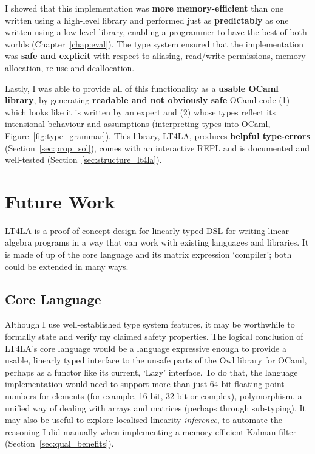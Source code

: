 I showed that this implementation was \textbf{more memory-efficient} than one
written using a high-level library and performed just as
\textbf{predictably} as one written using a low-level library,
enabling a programmer to have the best of both worlds
(Chapter~\ref{chap:eval}). The type system ensured that the implementation was
\textbf{safe and explicit} with respect to aliasing, read/write permissions,
memory allocation, re-use and deallocation.

Lastly, I was able to provide all of this functionality as a \textbf{usable
OCaml library}, by generating \textbf{readable and not obviously safe} OCaml
code (1) which looks like it is written by an expert and (2) whose types
reflect its intensional behaviour and assumptions (interpreting types into
OCaml, Figure~\ref{fig:type_grammar}). This library, LT4LA, produces
\textbf{helpful type-errors} (Section~\ref{sec:prop_sol}), comes with an
interactive REPL and is documented and well-tested
(Section~\ref{sec:structure_lt4la}).

\section{Future Work}

LT4LA is a proof-of-concept design for linearly typed DSL for writing
linear-algebra programs in a way that can work with existing languages and
libraries. It is made of up of the core language and its matrix expression
`compiler'; both could be extended in many ways.

\subsection{Core Language}

Although I use well-established type system features, it may be worthwhile to
formally state and verify my claimed safety properties.  The logical conclusion
of LT4LA's core language would be a language expressive enough to provide a
usable, linearly typed interface to the unsafe parts of the Owl library for
OCaml, perhaps as a functor like its current, `Lazy' interface.  To do that,
the language implementation would need to support more than just 64-bit
floating-point numbers for elements (for example, 16-bit, 32-bit or complex),
polymorphism, a unified way of dealing with arrays and matrices (perhaps
through sub-typing). It may also be useful to explore localised linearity
\emph{inference}, to automate the reasoning I did manually when implementing a
memory-efficient Kalman filter (Section~\ref{sec:qual_benefits}).

